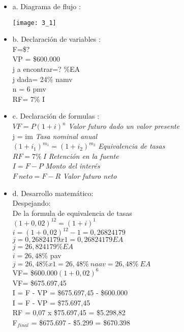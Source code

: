 \begin{itemize}
	\item a. Diagrama de flujo :\\
	
	
	\begin{center}
		\texttt{[image: 3\_1]}
	\end{center}
	
	\item b. Declaración de variables :\\
	F=\$?\\
	VP = \$600.000 \\	
	j a encontrar=? \%EA\\
	j dada= 24\% namv \\	
	n = 6 pmv \\
	RF= 7\% I
	
	\item c. Declaración de formulas :\\ 
	$VF=P(1+i)^n$ \hspace{35}\textit{Valor futuro dado un valor presente}\\
	j = im \hspace{35} \textit{        Tasa nominal anual}\\
	$(1+i_{1})^{m_{1}} = (1+i_{2})^{m_{2}}$\hspace{35} \textit{Equivalencia de tasas}\\
	$RF = 7\%\ I$     \textit{        Retención en la fuente} \\ 
    $I = F - P$      \textit{Monto del interés}\\ 
    $F\ neto = F - R$     \textit{         Valor futuro neto}\\
	
	\item d. Desarrollo matemático:\\
    Despejando:\\
    De la formula de equivalencia de tasas\\
    $ (1+0,02)^{12} = (1+i)^{1} $\\
    $i = (1 + 0,02)^{12} -1 = 0,26824179$\\
    $j = 0,26824179 x1 = 0,26824179 EA$\\
    $j = 26,824179\% EA$\\
    $i = 26,48\%$ pav\\
    $j = 26,48\% x1= 26,48\%\ naav = 26,48\%\ EA$\\
	VF= \$$600.000(1+0,02)^6$\\
	VF= \$675.697,45\\
	I = F - VP = \$675.697,45 - \$600.000\\
	I = F - VP = \$75.697,45\\
	RF = 0,07 x \$75.697,45 = \$5.298,82\\
	F$_{final}$ = \$675.697 - \$5.299 = \$670.398\\
	

\end{itemize}
